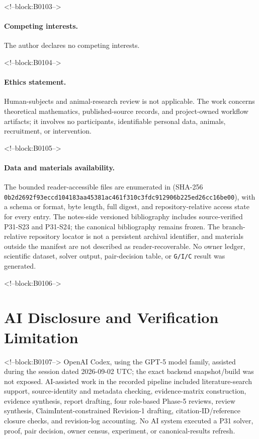\documentclass[11pt]{article}
\begin{document}
<!--block:B0103-->
\paragraph{Competing interests.} The author declares no competing
interests.

<!--block:B0104-->
\paragraph{Ethics statement.} Human-subjects and animal-research review
is not applicable. The work concerns theoretical mathematics,
published-source records, and project-owned workflow artifacts; it
involves no participants, identifiable personal data, animals,
recruitment, or intervention.

<!--block:B0105-->
\paragraph{Data and materials availability.} The bounded reader-accessible files
are enumerated in
 (SHA-256
\texttt{0b2d2692f93eccd104183aa45381ac461f310c3fdc912906b225ed26cc16be00}), with a schema or format, byte length, full digest, and
repository-relative access state for every entry.  The notes-side versioned
bibliography includes source-verified P31-S23 and P31-S24; the canonical
bibliography remains frozen.  The branch-relative repository locator is not a
persistent archival identifier, and materials outside the manifest are not
described as reader-recoverable.  No owner ledger, scientific dataset, solver
output, pair-decision table, or \texttt{G/I/C} result was generated.

<!--block:B0106-->
\hypertarget{ai-disclosure-and-verification-limitation}{%
\section*{AI Disclosure and Verification
Limitation}\label{ai-disclosure-and-verification-limitation}}

<!--block:B0107-->
OpenAI Codex, using the GPT-5 model family, assisted during the session
dated 2026-09-02 UTC; the exact backend snapshot/build was not exposed.
AI-assisted work in the recorded pipeline included literature-search
support, source-identity and metadata checking, evidence-matrix
construction, evidence synthesis, report drafting, four role-based
Phase-5 reviews, review synthesis, ClaimIntent-constrained Revision-1
drafting, citation-ID/reference closure checks, and revision-log
accounting. No AI system executed a P31 solver, proof, pair decision,
owner census, experiment, or canonical-results refresh.
\end{document}
